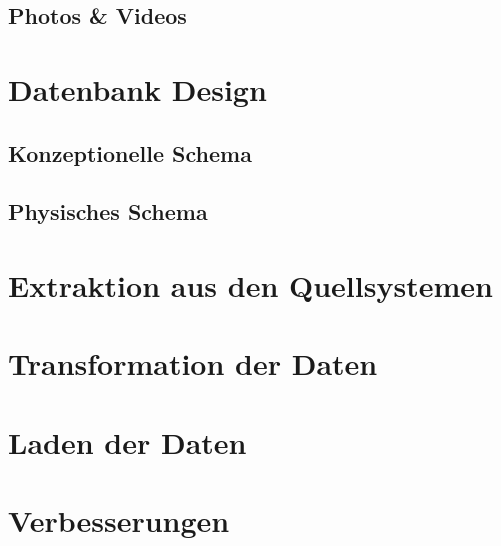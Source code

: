 
















\subsection{Photos \& Videos}
\section{Datenbank Design}
\subsection{Konzeptionelle Schema}
\subsection{Physisches Schema}
\section{Extraktion aus den Quellsystemen}
\section{Transformation der Daten}
\section{Laden der Daten}
\section{Verbesserungen}

